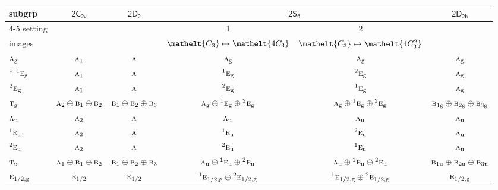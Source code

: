 \documentclass[10pt,a4paper]{article}
\numberwithin{equation}{section}
\newcommand{\eltfont}[1]{{\let\sigma\eltsigma\mathelt{#1}}}
\newcommand{\grp}[1]{\mathsf{#1}}
\newcommand{\irr}[1]{\text{\normalfont\scshape #1}}
\newcommand{\conjpair}[1]{{}^{#1}}
\newcommand{\cls}[1]{\eltfont{#1}}
\newcommand{\ptag}[1]{\mathrm{#1}}
\begin{document}
{\small\begin{longtable}{@{}lccccc@{}}\toprule
subgrp & \href{2C2v.pdf}{$\grp{2C_{2v}}$} & \href{2D2.pdf}{$\grp{2D_{2}}$} & \multicolumn{2}{c}{\href{2S6.pdf}{$\grp{2S_{6}}$}} & \href{2D2h.pdf}{$\grp{2D_{2h}}$}\\\cmidrule(lr){4-5}
setting &  &  & 1 & 2 & \\
images &  &  & {\scriptsize $\cls{C_{3}} \mapsto \cls{4C_{3}}$} & {\scriptsize $\cls{C_{3}} \mapsto \cls{4C_{3}^{2}}$} & \\\midrule\endhead
\bottomrule\endfoot\endlastfoot
$\irr{a}_{\ptag{g}}$ & $\irr{a}_{1}$ & $\irr{a}$ & $\irr{a}_{\ptag{g}}$ & $\irr{a}_{\ptag{g}}$ & $\irr{a}_{\ptag{g}}$\\*
$\conjpair{1}\irr{e}_{\ptag{g}}$ & $\irr{a}_{1}$ & $\irr{a}$ & $\conjpair{1}\irr{e}_{\ptag{g}}$ & $\conjpair{2}\irr{e}_{\ptag{g}}$ & $\irr{a}_{\ptag{g}}$\\
$\conjpair{2}\irr{e}_{\ptag{g}}$ & $\irr{a}_{1}$ & $\irr{a}$ & $\conjpair{2}\irr{e}_{\ptag{g}}$ & $\conjpair{1}\irr{e}_{\ptag{g}}$ & $\irr{a}_{\ptag{g}}$\\
$\irr{t}_{\ptag{g}}$ & $\irr{a}_{2}\oplus \irr{b}_{1}\oplus \irr{b}_{2}$ & $\irr{b}_{1}\oplus \irr{b}_{2}\oplus \irr{b}_{3}$ & $\irr{a}_{\ptag{g}}\oplus \conjpair{1}\irr{e}_{\ptag{g}}\oplus \conjpair{2}\irr{e}_{\ptag{g}}$ & $\irr{a}_{\ptag{g}}\oplus \conjpair{1}\irr{e}_{\ptag{g}}\oplus \conjpair{2}\irr{e}_{\ptag{g}}$ & $\irr{b}_{1\ptag{g}}\oplus \irr{b}_{2\ptag{g}}\oplus \irr{b}_{3\ptag{g}}$\\
$\irr{a}_{\ptag{u}}$ & $\irr{a}_{2}$ & $\irr{a}$ & $\irr{a}_{\ptag{u}}$ & $\irr{a}_{\ptag{u}}$ & $\irr{a}_{\ptag{u}}$\\
$\conjpair{1}\irr{e}_{\ptag{u}}$ & $\irr{a}_{2}$ & $\irr{a}$ & $\conjpair{1}\irr{e}_{\ptag{u}}$ & $\conjpair{2}\irr{e}_{\ptag{u}}$ & $\irr{a}_{\ptag{u}}$\\
$\conjpair{2}\irr{e}_{\ptag{u}}$ & $\irr{a}_{2}$ & $\irr{a}$ & $\conjpair{2}\irr{e}_{\ptag{u}}$ & $\conjpair{1}\irr{e}_{\ptag{u}}$ & $\irr{a}_{\ptag{u}}$\\
$\irr{t}_{\ptag{u}}$ & $\irr{a}_{1}\oplus \irr{b}_{1}\oplus \irr{b}_{2}$ & $\irr{b}_{1}\oplus \irr{b}_{2}\oplus \irr{b}_{3}$ & $\irr{a}_{\ptag{u}}\oplus \conjpair{1}\irr{e}_{\ptag{u}}\oplus \conjpair{2}\irr{e}_{\ptag{u}}$ & $\irr{a}_{\ptag{u}}\oplus \conjpair{1}\irr{e}_{\ptag{u}}\oplus \conjpair{2}\irr{e}_{\ptag{u}}$ & $\irr{b}_{1\ptag{u}}\oplus \irr{b}_{2\ptag{u}}\oplus \irr{b}_{3\ptag{u}}$\\
$\irr{e}_{1/2,\ptag{g}}$ & $\irr{e}_{1/2}$ & $\irr{e}_{1/2}$ & $\conjpair{1}\irr{e}_{1/2,\ptag{g}}\oplus \conjpair{2}\irr{e}_{1/2,\ptag{g}}$ & $\conjpair{1}\irr{e}_{1/2,\ptag{g}}\oplus \conjpair{2}\irr{e}_{1/2,\ptag{g}}$ & $\irr{e}_{1/2,\ptag{g}}$\\

\end{longtable}}
\end{document}
